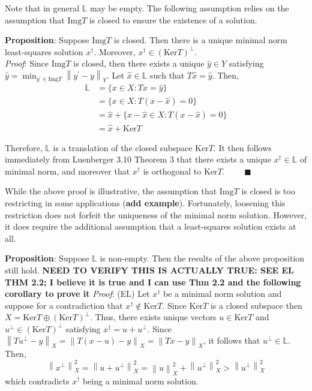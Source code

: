 \documentclass[12pt]{article}
\newcommand*{\norm}[1]{\left\lVert#1\right\rVert}
\newcommand{\Img}{\mathrm{Img}}
\newcommand{\Ker}{\mathrm{Ker}}
\begin{document}
 Note that in general $\mathbb{L}$ may be empty. The following assumption relies on the assumption that $\Img T$ is closed to ensure the existence of a solution. 
 
 \textbf{Proposition}: Suppose $\Img T$ is closed. Then there is a unique minimal norm least-squares solution $x^\dagger$. Moreover, $x^\dagger \in (\Ker T)^\perp$. \\[.1cm]
 
 \textit{Proof}: Since $\Img T$ is closed, then there exists a unique $\hat{y} \in Y$ satisfying $\hat{y} = \min_{y^\prime \in \Img T} \norm{y^\prime - y}_{Y}$. Let $\hat{x} \in \mathbb{L}$ such that $T\hat{x} = \hat{y}$. Then, 
 \begin{align*} 
 \mathbb{L} &= \{x \in X: Tx = \hat{y}\} \\
                   &= \{x \in X: T(x - \hat{x}) = 0\} \\
                   &= \hat{x} + \{x - \hat{x} \in X: T(x - \hat{x}) = 0\} \\
                   &= \hat{x} + \Ker T
 \end{align*}  
 
 Therefore, $ \mathbb{L}$ is a translation of the closed subspace $\Ker T$. It then follows immediately from Luenberger 3.10 Theorem 3 that there exists a unique $x^\dagger \in \mathbb{L}$ of minimal norm, and moreover that $x^\dagger$ is orthogonal to $\Ker T$. $\qquad \blacksquare$
 
 While the above proof is illustrative, the assumption that $\Img T$ is closed is too restricting in some applications (\textbf{add example}). Fortunately, loosening this restriction does not forfeit the uniqueness of the minimal norm solution. However, it does require the additional assumption that a least-squares solution exists at all. 
 
 \textbf{Proposition}: Suppose $\mathbb{L}$ is non-empty. Then the results of the above proposition still hold. 
 \textbf{NEED TO VERIFY THIS IS ACTUALLY TRUE: SEE EL THM 2.2; I believe it is true and I can use Thm 2.2 and the following corollary to prove it}
 \textit{Proof}: (EL) Let $x^\dagger$ be a minimal norm solution and suppose for a contradiction that $x^\dagger \notin \Ker T$. Since $\Ker T$ is a closed subspace then $X = \Ker T \oplus (\Ker T)^\perp$. Thus, there exists unique vectors $u \in \Ker T$ and $u^\perp \in (\Ker T)^\perp$ satisfying $x^\dagger = u + u^\perp$. Since $\norm{Tu^\perp - y}_X = \norm{T(x - u) - y}_X = \norm{Tx - y}_X$, it follows that $u^\perp \in \mathbb{L}$. Then, \[\norm{x^\perp}_{X}^{2} = \norm{u + u^\perp}_{X}^{2} = \norm{u}_{X}^{2} + \norm{u^\perp}_{X}^{2} > \norm{u^\perp}_{X}^{2}\]
 which contradicts $x^\dagger$ being a minimal norm solution. 
 
\end{document}
